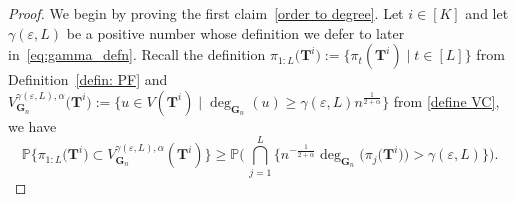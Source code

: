 \documentclass[twoside,11pt]{article}
\theoremstyle{remark}
\begin{document}
\begin{proof}
We begin by proving the first claim~\eqref{order to degree}. Let $i \in [K]$ and let $\gamma(\varepsilon, L)$ be a positive number whose definition we defer to later in~\eqref{eq:gamma_defn}. Recall the definition $\pi_{1:{L}}\bigl(\boldsymbol{T}^i\bigr):=\bigl\{{\pi}_t\left(\boldsymbol{T}^i\right)\mid t \in [L]\bigr\}$ from Definition~\ref{defin: PF} and $V^{\gamma\left(\varepsilon, L\right), \alpha}_{\boldsymbol{G}_n}\bigl(\boldsymbol{T}^i\bigr):= \bigl\{ u \in V\left(\boldsymbol{T}^i\right) \;\big|\; \operatorname{deg}_{\boldsymbol{G}_n}\left(u\right) \ge \gamma\left(\varepsilon, L\right) n^{\frac{1}{2+\alpha}} \bigr\}$ from \eqref{define VC}, we have
%
\begin{equation}
\label{lemma 1: eqn 1}
     \mathbb{P}\biggl\{\pi_{1:L}\bigl(\boldsymbol{T}^i\bigr)\subset V^{\gamma\left(\varepsilon, L\right), \alpha}_{\boldsymbol{G}_n}\left(\boldsymbol{T}^i\right)\biggr\} \geq 
    \mathbb{P}\Biggl(\,\bigcap^L_{j=1}\biggl\{n^{-\frac{1}{2+\alpha}}\operatorname{deg}_{\boldsymbol{G}_n}\bigl(\pi_{j}\bigl(\boldsymbol{T}^i\bigr)\bigr) >  \gamma\left(\varepsilon, L\right) \biggr\}\Biggr).
\end{equation}


\end{proof}
\end{document}
